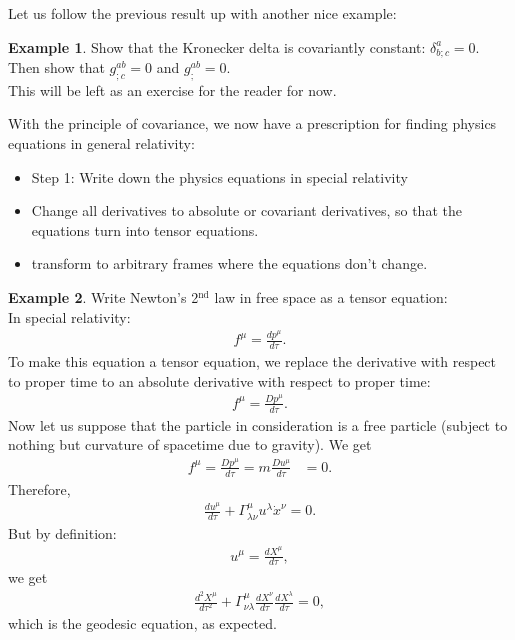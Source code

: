 \documentclass{book}
\theoremstyle{definition}
\newtheorem{exmp}{Example}[section]
\begin{document}
Let us follow the previous result up with another nice example:
\begin{exmp}
	Show that the Kronecker delta is covariantly constant: $\delta^a_{b;c} = 0$. Then show that $g^{ab}_{;c} = 0$ and $g^{ab}_{;} = 0$.\\
	
	This will be left as an exercise for the reader for now. 
\end{exmp}

With the principle of covariance, we now have a prescription for finding physics equations in general relativity: 
\begin{itemize}
	\item Step 1: Write down the physics equations in special relativity
	\item Change all derivatives to absolute or covariant derivatives, so that the equations turn into tensor equations.
	\item transform to arbitrary frames where the equations don't change.
\end{itemize}

\begin{exmp}
	Write Newton's 2$^{\text{nd}}$ law in free space as a tensor equation:\\
	
	In special relativity: 
	\begin{align*}
	f^\mu = \frac{dp^\mu}{d\tau}.
	\end{align*}
	To make this equation a tensor equation, we replace the derivative with respect to proper time to an absolute derivative with respect to proper time:
	\begin{align*}
	f^\mu = \frac{Dp^\mu}{d\tau}.
	\end{align*}
	Now let us suppose that the particle in consideration is a free particle (subject to nothing but curvature of spacetime due to gravity). We get
	\begin{align*}
	f^\mu = \frac{Dp^\mu}{d\tau} = m\frac{Du^\mu}{d\tau} &= 0.
	\end{align*}
	Therefore,
	\begin{align*}
	\frac{du^\mu}{d\tau} + \Gamma^\mu_{\lambda\nu}u^\lambda\dot{x}^\nu = 0.
	\end{align*}
	But by definition:
	\begin{align*}
	u^\mu = \frac{dX^\mu}{d\tau},
	\end{align*}
	we get
	\begin{align*}
	\frac{d^2X^\mu}{d\tau^2} + \Gamma^\mu_{\nu\lambda}\frac{dX^\nu}{d\tau}\frac{dX^\lambda}{d\tau} = 0,
	\end{align*}
	which is the geodesic equation, as expected. 
\end{exmp}
\end{document}
